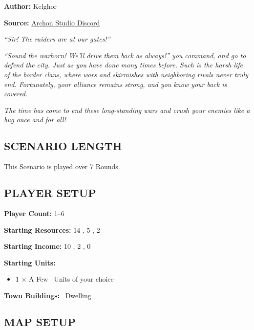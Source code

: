
\begin{multicols}{2}

\textbf{Author:} Kelghor

\textbf{Source:} \href{https://discord.com/channels/740870068178649108/1313651865648369725}{Archon Studio Discord}

\textit{``Sir! The raiders are at our gates!''}

\textit{``Sound the warhorn! We'll drive them back as always!'' you command, and go to defend the city. Just as you have done many times before. Such is the harsh life of the border clans, where wars and skirmishes with neighboring rivals never truly end. Fortunately, your alliance remains strong, and you know your back is covered.}

\textit{The time has come to end these long-standing wars and crush your enemies like a bug once and for all!}

\subsection*{\MakeUppercase{Scenario Length}}

This Scenario is played over 7 Rounds.

\subsection*{\MakeUppercase{Player Setup}}

\textbf{Player Count:} 1--6

\textbf{Starting Resources:} 14 , 5 , 2 

\textbf{Starting Income:} 10 , 2 , 0 

\textbf{Starting Units:}
\begin{itemize}
  \item  1 × A Few \bronze\ Units of your choice
\end{itemize}

\textbf{Town Buildings:} \bronze\ Dwelling

\subsection*{\MakeUppercase{Map Setup}}


\end{multicols}
